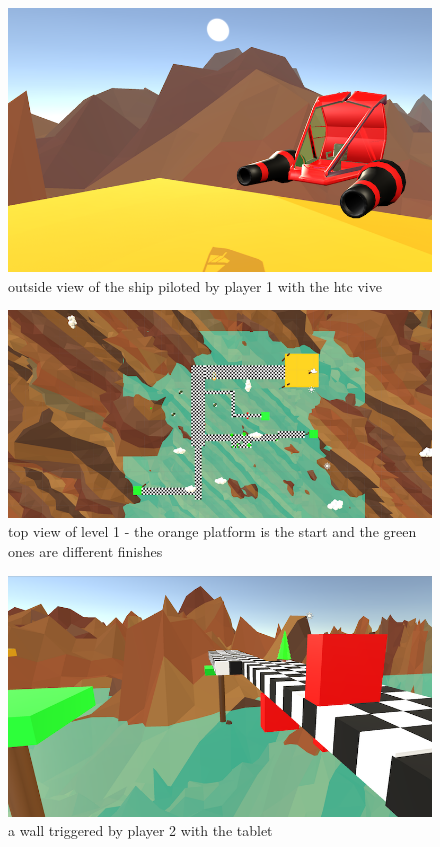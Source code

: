 \documentclass[12pt]{article}
\begin{document}
\begin{figure}[!h]
   \caption{\label{étiquette} outside view of the ship piloted by player 1 with the htc vive}
   \includegraphics[scale=0.6]{images/ship.png}
\end{figure}

\begin{figure}[!h]
   \caption{\label{étiquette} top view of level 1 - the orange platform is the start and the green ones are different finishes}
   \includegraphics[scale=0.6]{images/topview.png}
\end{figure}

\begin{figure}[!h]
   \caption{\label{étiquette} a wall triggered by player 2 with the tablet}
   \includegraphics[scale=0.6]{images/wall.png}
\end{figure}
\end{document}
